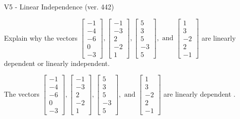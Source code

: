 \begin{exercise}
  \begin{exerciseTitle}V5 - Linear Independence (ver. 442)\end{exerciseTitle}
  \begin{exerciseStatement}
    Explain why the vectors \(\left[\begin{array}{r}
-1 \\
-4 \\
-6 \\
0 \\
-3
\end{array}\right] , \left[\begin{array}{r}
-1 \\
-3 \\
2 \\
-2 \\
1
\end{array}\right] , \left[\begin{array}{r}
5 \\
3 \\
5 \\
-3 \\
5
\end{array}\right] , \text{ and } \left[\begin{array}{r}
1 \\
3 \\
-2 \\
2 \\
-1
\end{array}\right]\) are linearly dependent or linearly independent.	


  \end{exerciseStatement}
  \begin{exerciseAnswer}
   The vectors \(\left[\begin{array}{r}
-1 \\
-4 \\
-6 \\
0 \\
-3
\end{array}\right] , \left[\begin{array}{r}
-1 \\
-3 \\
2 \\
-2 \\
1
\end{array}\right] , \left[\begin{array}{r}
5 \\
3 \\
5 \\
-3 \\
5
\end{array}\right] , \text{ and } \left[\begin{array}{r}
1 \\
3 \\
-2 \\
2 \\
-1
\end{array}\right]\) are 
  	 linearly dependent  .
  


  \end{exerciseAnswer}
\end{exercise}